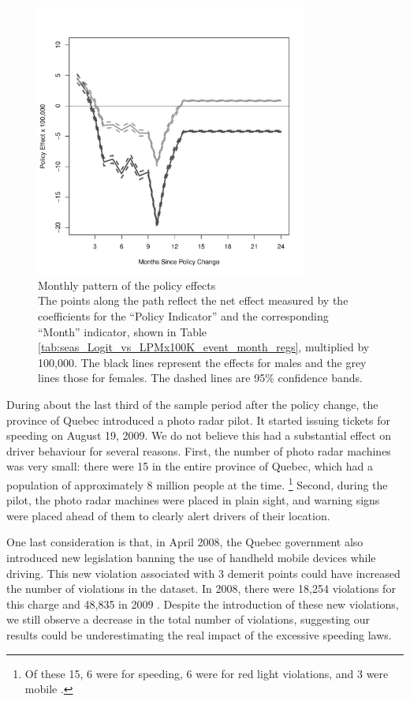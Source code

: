 \documentclass{cje}
\begin{document}
\begin{figure}
\centering
\includegraphics[width=0.8\textwidth]{Figure4}
\caption{Monthly pattern of the policy effects \\
The points along the path reflect the net effect measured by 
the coefficients for the ``Policy Indicator'' 
and the corresponding ``Month'' indicator, 
shown in Table \ref{tab:seas_Logit_vs_LPMx100K_event_month_regs}, 
multiplied by 100,000. 
The black lines represent the effects for males 
and the grey lines those for females. 
The dashed lines are 95\% confidence bands. 
}\label{fig:event_study}
\end{figure}



During about the last third of the sample period after the policy change, 
the province of Quebec introduced a photo radar pilot. 
It started issuing tickets for speeding on August 19, 2009. 
We do not believe this had a substantial effect on driver behaviour for several reasons. 
First, the number of photo radar machines was very small: 
there were 15 in the entire province of Quebec, 
which had a population of approximately 8 million people at the time.%
\footnote{%
Of these 15, 6 were for speeding, 6 were for red light violations, and 3 were mobile 
\citep{bisson2020}.
}  
%
Second, during the pilot, 
the photo radar machines were placed in plain sight, 
and warning signs were placed ahead of them to clearly alert drivers of their location.

One last consideration is that, in April 2008, 
the Quebec government also introduced new legislation 
banning the use of handheld mobile devices while driving. 
This new violation associated with 3 demerit points could have 
increased the number of violations in the dataset. 
In 2008, there were 18,254 violations for this charge and 48,835 in 2009 
% 
\citep[table 1.3]{SAAQ2010}.
%  
Despite the introduction of these new violations, 
we still observe a decrease in the total number of violations, 
suggesting our results could be underestimating the real impact of the excessive speeding laws.
\end{document}
